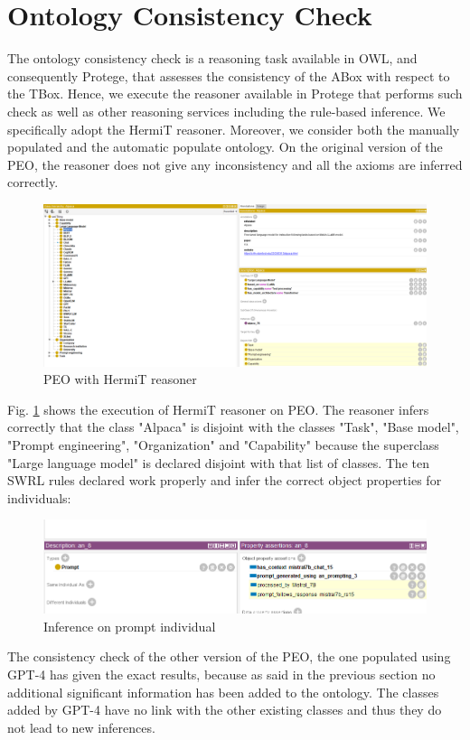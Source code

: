 \section{Ontology Consistency Check}
\label{section:5_1_consistency}
The ontology consistency check is a reasoning task available in OWL, and consequently Protege, that assesses the consistency of the ABox with respect to the TBox.
Hence, we execute the reasoner available in Protege that performs such check as well as other reasoning services including the rule-based inference.
We specifically adopt the HermiT reasoner.
Moreover, we consider both the manually populated and the automatic populate ontology.
On the original version of the PEO, the reasoner does not give any inconsistency and all the axioms are inferred correctly.
\begin{figure}[H]
    \centering
    \includegraphics[width=0.9\linewidth]{Figures/fig_39.png}
    \caption{PEO with HermiT reasoner}
    \label{fig:39}
\end{figure}
Fig. \ref{fig:39} shows the execution of HermiT reasoner on PEO.
The reasoner infers correctly that the class "Alpaca" is disjoint with the classes "Task", "Base model", "Prompt engineering", "Organization" and "Capability" because the superclass "Large language model" is declared disjoint with that list of classes.
The ten SWRL rules declared work properly and infer the correct object properties for individuals:
\begin{figure}[H]
    \centering
    \includegraphics[width=0.9\linewidth]{Figures/fig_40.png}
    \caption{Inference on prompt individual}
    \label{fig:40}
\end{figure}
The consistency check of the other version of the PEO, the one populated using GPT-4 has given the exact results,  because as said in the previous section no additional significant information has been added to the ontology.
The classes added by GPT-4 have no link with the other existing classes and thus they do not lead to new inferences.

